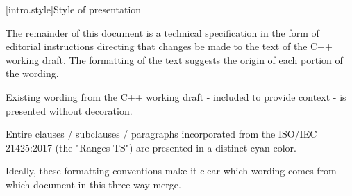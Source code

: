 
[intro.style]{Style of presentation}

\pnum
The remainder of this document is a technical specification in the form of
editorial instructions directing that changes be made to the text of the C++
working draft. The formatting of the text suggests the origin of each portion of
the wording.

Existing wording from the C++ working draft - included to provide context - is
presented without decoration.

\begin{addedblock}
Entire clauses / subclauses / paragraphs incorporated from the ISO/IEC 21425:2017
(the "Ranges TS") are presented in a distinct cyan color.
\end{addedblock}





Ideally, these formatting conventions make it clear which wording comes from
which document in this three-way merge.

